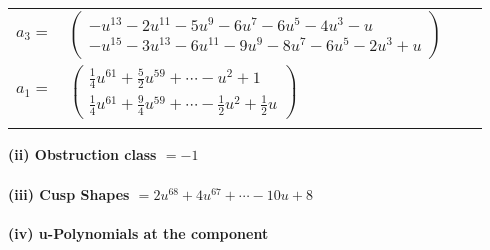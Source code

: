 \documentclass[1p]{elsarticle_modified}
\theoremstyle{definition}
\begin{document}
\begin{tabular}{m{7pt} m{180pt} m{7pt} m{180pt} }
\flushright $a_{3}=$&$\begin{pmatrix}- u^{13}-2 u^{11}-5 u^9-6 u^7-6 u^5-4 u^3- u\\- u^{15}-3 u^{13}-6 u^{11}-9 u^9-8 u^7-6 u^5-2 u^3+u\end{pmatrix}$ \\
\flushright $a_{1}=$&$\begin{pmatrix}\frac{1}{4} u^{61}+\frac{5}{2} u^{59}+\cdots- u^2+1\\\frac{1}{4} u^{61}+\frac{9}{4} u^{59}+\cdots-\frac{1}{2} u^2+\frac{1}{2} u\end{pmatrix}$\\&\end{tabular}
\flushleft \textbf{(ii) Obstruction class $= -1$}\\~\\
\flushleft \textbf{(iii) Cusp Shapes $= 2 u^{68}+4 u^{67}+\cdots-10 u+8$}\\~\\
\newpage\renewcommand{\arraystretch}{1}
\flushleft \textbf{(iv) u-Polynomials at the component}\newline \\
\end{document}
